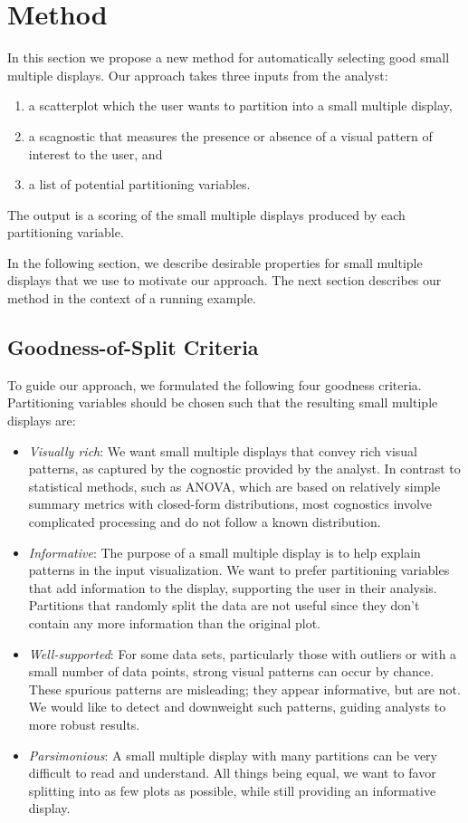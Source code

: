 \section{Method}
\label{sec:method}

In this section we propose a new method for automatically selecting good small multiple displays. Our approach takes three inputs from the analyst:
\begin{enumerate}
\item a scatterplot which the user wants to partition into a small multiple display,
\item a scagnostic that measures the presence or absence of a visual pattern of interest to the user, and
\item a list of potential partitioning variables.
\end{enumerate}
The output is a scoring of the small multiple displays produced by each partitioning variable.

In the following section, we describe desirable properties for small multiple displays that we use to motivate our approach. The next section describes our method in the context of a running example.

\subsection{Goodness-of-Split Criteria}
To guide our approach, we formulated the following four goodness criteria. Partitioning variables should be chosen such that the resulting small multiple displays are:
\begin{itemize}
\item \emph{Visually rich}: We want small multiple displays that convey rich visual patterns, as captured by the cognostic provided by the analyst. In contrast to statistical methods, such as ANOVA, which are based on relatively simple summary metrics with closed-form distributions, most cognostics involve complicated processing and do not follow a known distribution.

\item \emph{Informative}: The purpose of a small multiple display is to help explain patterns in the input visualization. We want to prefer partitioning variables that add information to the display, supporting the user in their analysis. Partitions that randomly split the data are not useful since they don't contain any more information than the original plot.

\item \emph{Well-supported}: For some data sets, particularly those with outliers or with a small number of data points, strong visual patterns can occur by chance. These spurious patterns are misleading; they appear informative, but are not. We would like to detect and downweight such  patterns, guiding analysts to more robust results.

\item \emph{Parsimonious}: A small multiple display with many partitions can be very difficult to read and understand. All things being equal, we want to favor splitting into as few plots as possible, while still providing an informative display.
\end{itemize}

